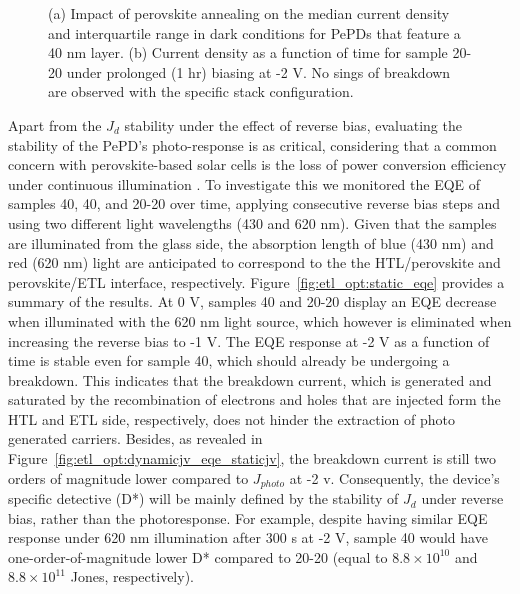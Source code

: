\begin{figure}[htbp]
    \caption{(a) Impact of perovskite annealing on the median current density and interquartile range in dark conditions for PePDs that feature a 40 nm  layer. (b) Current density as a function of time for sample 20-20 under prolonged (1 hr) biasing at -2 V. No sings of breakdown are observed with the specific stack configuration.}   \label{fig:et_optim:c60_variability_and_1hr_stability}
\end{figure}

Apart from the $J_d$ stability under the effect of reverse bias, evaluating the stability of the PePD's photo-response is as critical, considering that a common concern with perovskite-based solar cells is the loss of power conversion efficiency under continuous illumination \cite{Song2022CriticalAdditives, Fu2019I2Conditions,Khadka2021InsightsJunction}. To investigate this we monitored the EQE of samples 40, 40, and 20-20 over time, applying consecutive reverse bias steps and using two different light wavelengths (430 and 620 nm). Given that the samples are illuminated from the glass side, the absorption length of blue (430 nm) and red (620 nm) light are anticipated to correspond to the the HTL/perovskite and perovskite/ETL interface, respectively. Figure~\ref{fig:etl_opt:static_eqe} provides a summary of the results. At 0 V, samples 40 and 20-20 display an EQE decrease when illuminated with the 620 nm light source, which however is eliminated when increasing the reverse bias to -1 V. The EQE response at -2 V as a function of time is stable even for sample 40, which should already be undergoing a breakdown. This indicates that the breakdown current, which is generated and saturated by the recombination of electrons and holes that are injected form the HTL and ETL side, respectively, does not hinder the extraction of photo generated carriers. Besides, as revealed in Figure~\ref{fig:etl_opt:dynamicjv_eqe_staticjv}, the breakdown current is still two orders of magnitude lower compared to $J_{photo}$ at -2 v. Consequently, the device's specific detective (D*) will be mainly defined by the stability of $J_d$ under reverse bias, rather than the photoresponse. For example, despite having similar EQE response under 620 nm illumination after 300 s at -2 V, sample 40 would have one-order-of-magnitude lower D* compared to 20-20 (equal to $8.8\times 10^{10}$ and  $8.8\times 10^{11}$ Jones, respectively). 


